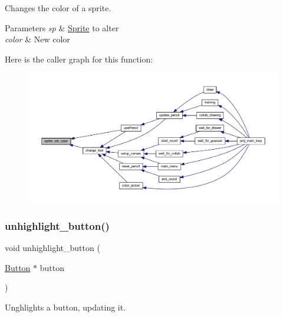 Changes the color of a sprite. 


\begin{DoxyParams}{Parameters}
{\em sp} & \mbox{\hyperlink{struct_sprite}{Sprite}} to alter \\
\hline
{\em color} & New color \\
\hline
\end{DoxyParams}
Here is the caller graph for this function\+:\nopagebreak
\begin{figure}[H]
\begin{center}
\leavevmode
\includegraphics[width=350pt]{group__sprite_ga9b18b2f3de6d4ee00e344881a08b17d6_icgraph}
\end{center}
\end{figure}
\mbox{\label{group__sprite_gaa28b2a8d13a3ab9e23c3d91691614c81}} 
\subsubsection{\texorpdfstring{unhighlight\+\_\+button()}{unhighlight\_button()}}
{\footnotesize\ttfamily void unhighlight\+\_\+button (\begin{DoxyParamCaption}\item[{\mbox{\hyperlink{struct_button}{Button}} $\ast$}]{button }\end{DoxyParamCaption})}



Unghlights a button, updating it. 


